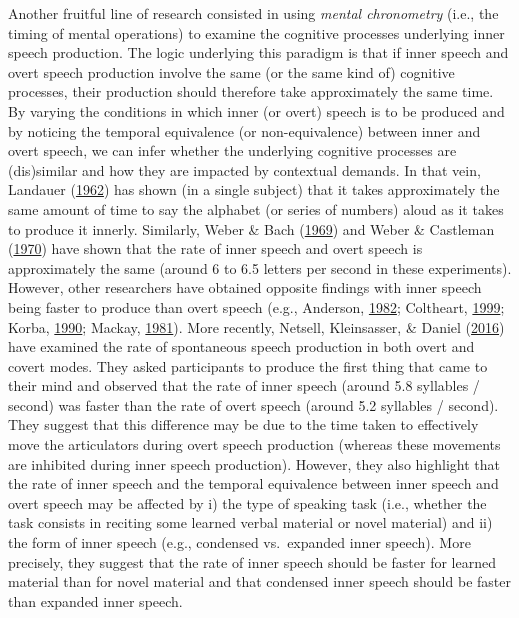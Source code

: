 \documentclass[a4paper,12pt,twoside,onecolumn,openright,final,oldfontcommands]{memoir}
\begin{document}
Another fruitful line of research consisted in using \emph{mental chronometry} (i.e., the timing of mental operations) to examine the cognitive processes underlying inner speech production. The logic underlying this paradigm is that if inner speech and overt speech production involve the same (or the same kind of) cognitive processes, their production should therefore take approximately the same time. By varying the conditions in which inner (or overt) speech is to be produced and by noticing the temporal equivalence (or non-equivalence) between inner and overt speech, we can infer whether the underlying cognitive processes are (dis)similar and how they are impacted by contextual demands. In that vein, Landauer (\protect\hyperlink{ref-landauer_rate_1962}{1962}) has shown (in a single subject) that it takes approximately the same amount of time to say the alphabet (or series of numbers) aloud as it takes to produce it innerly. Similarly, Weber \& Bach (\protect\hyperlink{ref-weber_visual_1969}{1969}) and Weber \& Castleman (\protect\hyperlink{ref-weber_time_1970}{1970}) have shown that the rate of inner speech and overt speech is approximately the same (around 6 to 6.5 letters per second in these experiments). However, other researchers have obtained opposite findings with inner speech being faster to produce than overt speech (e.g., Anderson, \protect\hyperlink{ref-anderson_speech_1982}{1982}; Coltheart, \protect\hyperlink{ref-coltheart_phonological_1999}{1999}; Korba, \protect\hyperlink{ref-korba_rate_1990}{1990}; Mackay, \protect\hyperlink{ref-mackay_problem_1981}{1981}). More recently, Netsell, Kleinsasser, \& Daniel (\protect\hyperlink{ref-netsell_rate_2016}{2016}) have examined the rate of spontaneous speech production in both overt and covert modes. They asked participants to produce the first thing that came to their mind and observed that the rate of inner speech (around 5.8 syllables / second) was faster than the rate of overt speech (around 5.2 syllables / second). They suggest that this difference may be due to the time taken to effectively move the articulators during overt speech production (whereas these movements are inhibited during inner speech production). However, they also highlight that the rate of inner speech and the temporal equivalence between inner speech and overt speech may be affected by i) the type of speaking task (i.e., whether the task consists in reciting some learned verbal material or novel material) and ii) the form of inner speech (e.g., condensed vs.~expanded inner speech). More precisely, they suggest that the rate of inner speech should be faster for learned material than for novel material and that condensed inner speech should be faster than expanded inner speech.
\end{document}
